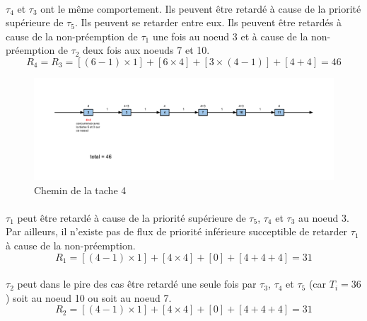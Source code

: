 \documentclass[10pt,a4paper]{article}
\newenvironment{figureH} {%
\begin{figure}[H]
}{%
\end{figure}
}
\begin{document}
\paragraph{}
$\tau_4$ et $\tau_3$ ont le même comportement. Ils peuvent être retardé à cause de la priorité supérieure de $\tau_5$. Ils peuvent se retarder entre eux. Ils peuvent être retardés à cause de la non-préemption de $\tau_1$ une fois au noeud 3 et à cause de la non-préemption de $\tau_2$ deux fois aux noeuds 7 et 10.
\[ R_{4} = R_3 = [(6-1) \times 1] +[ 6 \times 4] +[ 3 \times (4-1) ]+[ 4 + 4] = 46 \]

\begin{figureH}
  \includegraphics[width=\textwidth]{images/tache4.pdf}
  \center
  \caption{Chemin de la tache 4}
        \label{image_global}
\end{figureH}

\paragraph{}
$\tau_1$ peut être retardé à cause de la priorité supérieure de $\tau_5$, $\tau_4$ et $\tau_3$ au noeud 3. Par ailleurs, il n'existe pas de flux de priorité inférieure succeptible de retarder $\tau_1$ à cause de la non-préemption.
\[ R_1 = [(4-1)\times 1 ]+[ 4 \times 4] +[ 0] +[ 4 +4 +4] = 31 \]

\paragraph{}
$\tau_2$ peut dans le pire des cas être retardé une seule fois par $\tau_3$, $\tau_4$ et $\tau_5$ (car $T_i = 36$) soit au noeud 10 ou soit au noeud 7.
\[ R_2 = [(4-1) \times 1 ] + [4 \times 4 ] + [0] + [4+4+4] = 31\]


    
\end{document}

